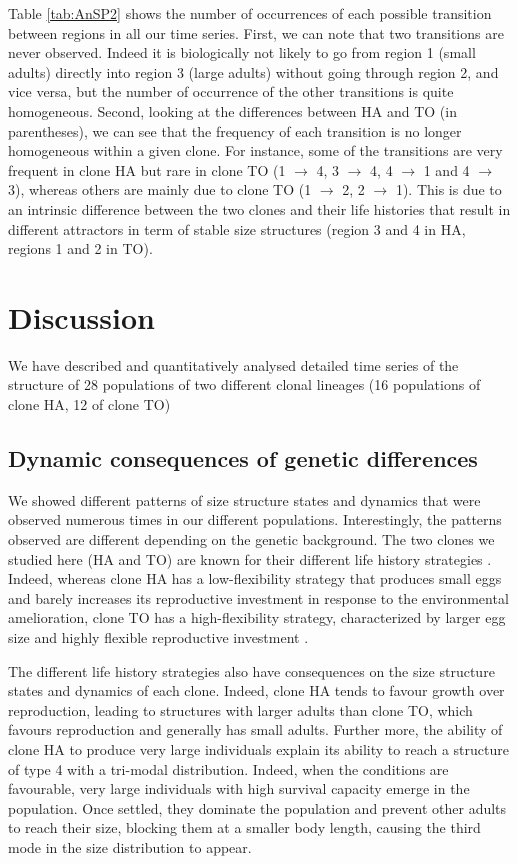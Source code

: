 Table \ref{tab:AnSP2} shows the number of occurrences of each possible
transition between regions in all our time series. First, we can note that two transitions are
never observed. Indeed it is biologically not likely to go from region 1 (small
adults) directly into region 3 (large adults) without going through region 2,
and vice versa, but the number of occurrence of the other transitions is quite
homogeneous. Second, looking at the differences between HA and TO (in
parentheses), we can see that the frequency of each transition is no longer
homogeneous within a given clone. For instance, some of the transitions are very
frequent in clone HA but rare in clone TO (1 $\rightarrow$ 4, 3 $\rightarrow$ 4, 4 $\rightarrow$ 1 and 4 $\rightarrow$ 3), whereas
others are mainly due to clone TO (1 $\rightarrow$ 2, 2 $\rightarrow$ 1). This is due to an intrinsic
difference between the two clones and their life histories that result in
different attractors in term of stable size structures (region 3 and 4 in HA,
regions 1 and 2 in TO).

\section{Discussion}

We have described and quantitatively analysed detailed time series of the
structure of 28 populations of two different clonal lineages (16 populations of
clone HA, 12 of clone TO)

\subsection{Dynamic consequences of genetic differences}

We showed different patterns of size structure states and dynamics that were
observed numerous times in our different populations. Interestingly, the
patterns observed are different depending on the genetic background. The two
clones we studied here (HA and TO) are known for their different life history
strategies \autocites{tully2006a,tully2008a}. Indeed, whereas
clone HA has a low-flexibility strategy that produces small eggs and barely increases its
reproductive investment in response to the environmental amelioration, clone TO
has a high-flexibility strategy, characterized by larger egg size and highly
flexible reproductive investment \autocites{tully2008a}.

The different life history strategies also have consequences on the size
structure states and dynamics of each clone. Indeed, clone HA tends to favour
growth over reproduction, leading to structures with larger adults than clone
TO, which favours reproduction and generally has small adults. Further more, the
ability of clone HA to produce very large individuals explain its ability to
reach a structure of type 4 with a tri-modal distribution. Indeed, when the
conditions are favourable, very large individuals with high survival capacity
emerge in the population. Once settled, they dominate the population and prevent
other adults to reach their size, blocking them at a smaller body length,
causing the third mode in the size distribution to appear.

